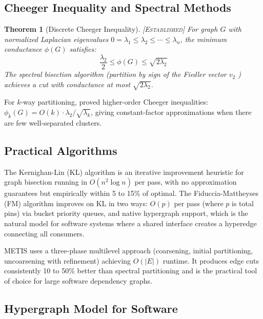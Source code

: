 \documentclass[11pt]{article}
\newtheorem{theorem}{Theorem}[section]
\theoremstyle{definition}
\theoremstyle{remark}
\newcommand{\established}{\textsc{[Established]}}
\begin{document}
\subsection{Cheeger Inequality and Spectral Methods}

\begin{theorem}[Discrete Cheeger Inequality] \established{}
\label{thm:cheeger}
For graph $G$ with normalized Laplacian eigenvalues $0 = \lambda_1 \leq \lambda_2 \leq \cdots \leq \lambda_n$, the minimum conductance $\phi(G)$ satisfies:
\begin{equation}
\label{eq:cheeger}
  \frac{\lambda_2}{2} \leq \phi(G) \leq \sqrt{2\lambda_2}
\end{equation}
The spectral bisection algorithm (partition by sign of the Fiedler vector $v_2$ \citep{Fiedler1973}) achieves a cut with conductance at most $\sqrt{2\lambda_2}$.
\end{theorem}

For $k$-way partitioning, \citet{Lee2012cheeger} proved higher-order Cheeger inequalities: $\phi_k(G) = O(k) \cdot \lambda_2 / \sqrt{\lambda_k}$, giving constant-factor approximations when there are few well-separated clusters.

\subsection{Practical Algorithms}

The Kernighan-Lin (KL) algorithm \citep{KernighanLin1970} is an iterative improvement heuristic for graph bisection running in $O(n^2 \log n)$ per pass, with no approximation guarantees but empirically within 5 to 15\% of optimal.
The Fiduccia-Mattheyses (FM) algorithm \citep{FiducciaMattheyses1982} improves on KL in two ways: $O(p)$ per pass (where $p$ is total pins) via bucket priority queues, and native hypergraph support, which is the natural model for software systems where a shared interface creates a hyperedge connecting all consumers.

METIS \citep{KarypisKumar1998} uses a three-phase multilevel approach (coarsening, initial partitioning, uncoarsening with refinement) achieving $O(|E|)$ runtime.
It produces edge cuts consistently 10 to 50\% better than spectral partitioning and is the practical tool of choice for large software dependency graphs.

\subsection{Hypergraph Model for Software}
\end{document}
